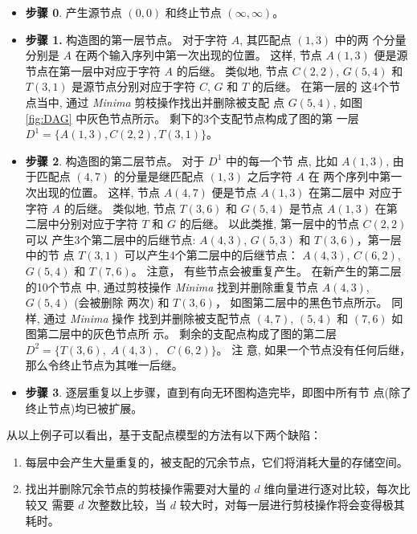 \begin{itemize}
\item \textbf{步骤 0}. 产生源节点 $(0,0)$ 和终止节点 $(\infty, \infty)$。
\item \textbf{步骤 1.} 构造图的第一层节点。 对于字符 $A$, 其匹配点 $(1,3)$ 中的两
  个分量分别是 $A$ 在两个输入序列中第一次出现的位置。 这样, 节点 $A(1,3)$ 便是源
  节点在第一层中对应于字符 $A$ 的后继。 类似地, 节点 $C(2,2)$,
  $G(5,4)$ 和 $T(3,1)$ 是源节点分别对应于字符 $C$, $G$ 和 $T$ 的后继。 在第一层的
  这4个节点当中, 通过 \emph{Minima} 剪枝操作找出并删除被支配
  点 $G(5,4)$, 如图 \ref{fig:DAG} 中灰色节点所示。 剩下的3个支配节点构成了图的第
  一层 $D^1=\{A(1,3),C(2,2),T(3,1)\}$。
  
\item \textbf{步骤 2}. 构造图的第二层节点。 对于 $D^1$ 中的每一个节
  点, 比如 $A(1,3)$, 由于匹配点 $(4,7)$ 的分量是继匹配点 $(1,3)$ 之后字符 $A$ 在
  两个序列中第一次出现的位置。 这样, 节点 $A(4,7)$ 便是节点 $A(1, 3)$ 在第二层中
  对应于字符 $A$ 的后继。 类似地, 节点 $T(3,6)$ 和 $G(5,4)$ 是节点 $A(1, 3)$ 在第
  二层中分别对应于字符 $T$ 和 $G$ 的后继。 以此类推, 第一层中的节点 $C(2,2)$ 可以
  产生3个第二层中的后继节点: $A(4,3)$, $G(5,3)$ 和 $T(3,6)$，第一层中的节
  点 $T(3,1)$ 可以产生4个第二层中的后继节点： $A(4,3)$, $C(6,2)$,
  $G(5,4)$ 和 $T(7,6)$。 注意， 有些节点会被重复产生。 在新产生的第二层的10个节点
  中, 通过剪枝操作 \emph{Minima} 找到并删除重复节点 $A(4,3)$, $G(5,4)$ (会被删除
  两次) 和 $T(3,6)$， 如图第二层中的黑色节点所示。 同样, 通过 \emph{Minima} 操作
  找到并删除被支配节点 $(4, 7)$, $(5, 4)$ 和 $(7, 6)$ 如图第二层中的灰色节点所
  示。 剩余的支配点构成了图的第二层 $D^2=\{T(3, 6),\; A(4, 3),\;$ $C(6,2)\}$。 注
  意, 如果一个节点没有任何后继，那么令终止节点为其唯一后继。
\item \textbf{步骤 3}. 逐层重复以上步骤，直到有向无环图构造完毕，即图中所有节
  点(除了终止节点)均已被扩展。
  
\end{itemize}

从以上例子可以看出，基于支配点模型的方法有以下两个缺陷：
\begin{enumerate}
\item 每层中会产生大量重复的，被支配的冗余节点，它们将消耗大量的存储空间。
\item 找出并删除冗余节点的剪枝操作需要对大量的 $d$ 维向量进行逐对比较，每次比较又
  需要 $d$ 次整数比较，当 $d$ 较大时，对每一层进行剪枝操作将会变得极其耗时。
\end{enumerate}

